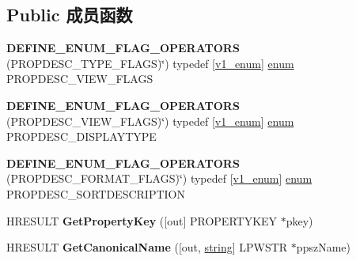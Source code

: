\subsection*{Public 成员函数}
\begin{DoxyCompactItemize}
\item 
\mbox{\label{interface_i_property_description_a66b77759f921d8b6bb0fd176accdab73}} 
{\bfseries D\+E\+F\+I\+N\+E\+\_\+\+E\+N\+U\+M\+\_\+\+F\+L\+A\+G\+\_\+\+O\+P\+E\+R\+A\+T\+O\+RS} (P\+R\+O\+P\+D\+E\+S\+C\+\_\+\+T\+Y\+P\+E\+\_\+\+F\+L\+A\+GS)\char`\"{}) typedef \mbox{[}\hyperlink{interfacev1__enum}{v1\+\_\+enum}\mbox{]} \hyperlink{interfaceenum}{enum} P\+R\+O\+P\+D\+E\+S\+C\+\_\+\+V\+I\+E\+W\+\_\+\+F\+L\+A\+GS 
\item 
\mbox{\label{interface_i_property_description_af27a0417231137c9d60b77ee15af5893}} 
{\bfseries D\+E\+F\+I\+N\+E\+\_\+\+E\+N\+U\+M\+\_\+\+F\+L\+A\+G\+\_\+\+O\+P\+E\+R\+A\+T\+O\+RS} (P\+R\+O\+P\+D\+E\+S\+C\+\_\+\+V\+I\+E\+W\+\_\+\+F\+L\+A\+GS)\char`\"{}) typedef \mbox{[}\hyperlink{interfacev1__enum}{v1\+\_\+enum}\mbox{]} \hyperlink{interfaceenum}{enum} P\+R\+O\+P\+D\+E\+S\+C\+\_\+\+D\+I\+S\+P\+L\+A\+Y\+T\+Y\+PE 
\item 
\mbox{\label{interface_i_property_description_a8aabc8041a615a473987501584606532}} 
{\bfseries D\+E\+F\+I\+N\+E\+\_\+\+E\+N\+U\+M\+\_\+\+F\+L\+A\+G\+\_\+\+O\+P\+E\+R\+A\+T\+O\+RS} (P\+R\+O\+P\+D\+E\+S\+C\+\_\+\+F\+O\+R\+M\+A\+T\+\_\+\+F\+L\+A\+GS)\char`\"{}) typedef \mbox{[}\hyperlink{interfacev1__enum}{v1\+\_\+enum}\mbox{]} \hyperlink{interfaceenum}{enum} P\+R\+O\+P\+D\+E\+S\+C\+\_\+\+S\+O\+R\+T\+D\+E\+S\+C\+R\+I\+P\+T\+I\+ON 
\item 
\mbox{\label{interface_i_property_description_aa75c662d72f4aa88169a81f31cb265a5}} 
H\+R\+E\+S\+U\+LT {\bfseries Get\+Property\+Key} (\mbox{[}out\mbox{]} P\+R\+O\+P\+E\+R\+T\+Y\+K\+EY $\ast$pkey)
\item 
\mbox{\label{interface_i_property_description_a22009a07678f2c9e4267a07b1d8d7df2}} 
H\+R\+E\+S\+U\+LT {\bfseries Get\+Canonical\+Name} (\mbox{[}out, \hyperlink{structstring}{string}\mbox{]} L\+P\+W\+S\+TR $\ast$ppsz\+Name)
\item 

\end{DoxyCompactItemize}
